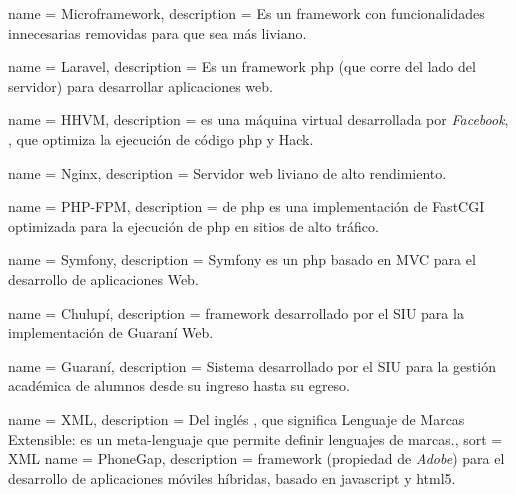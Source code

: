  {
  name = {Microframework},
  description = {Es un \gls{framework} con funcionalidades innecesarias removidas para que sea más liviano.}
}


 {
  name = {Laravel},
  description = {Es un \gls{framework} \gls{php} (que corre del lado del servidor) para desarrollar aplicaciones web.}
}

 {
  name = {HHVM},
  description = { es una máquina virtual desarrollada por \textit{Facebook}, , que optimiza la ejecución de código \gls{php} y Hack.}
}


 {
  name = {Nginx},
  description = {Servidor web liviano de alto rendimiento.}
}

 {
  name = {PHP-FPM},
  description = { de \gls{php} es una implementación de FastCGI optimizada para la ejecución de \gls{php} en sitios de alto tráfico.}
}

 {
  name = {Symfony},
  description = {Symfony es un  \gls{php} basado en MVC para el desarrollo de aplicaciones Web.}
}

 {
  name = {Chulupí},
  description = {\gls{framework} desarrollado por el SIU para la implementación de Guaraní Web.}
}

 {
  name = {Guaraní},
  description = {Sistema desarrollado por el SIU para la gestión académica de alumnos desde su ingreso hasta su egreso.}
}

 {
  name = {XML},
  description = {Del inglés , que significa Lenguaje de Marcas Extensible: es un meta-lenguaje que permite definir lenguajes de marcas.},
  sort = {XML}
}
 {
  name = {PhoneGap},
  description = {\gls{framework} (propiedad de \textit{Adobe}) para el desarrollo de aplicaciones móviles híbridas, basado en \gls{javascript} y \gls{html}5.}
}

